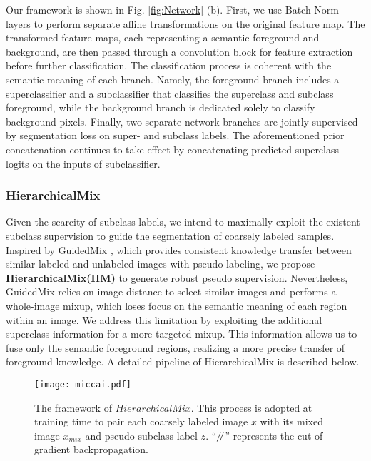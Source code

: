 \documentclass[runningheads]{llncs}
\newcommand{\sslash}{\mathbin{/\mkern-4mu/}}
\begin{document}
Our framework is shown in Fig. \ref{fig:Network} (b). First, we use Batch Norm layers\cite{ioffe2015batch} to perform separate affine transformations on the original feature map. The transformed feature maps, each representing a semantic foreground and background, are then passed through a convolution block for feature extraction before further classification. The classification process is coherent with the semantic meaning of each branch. Namely, the foreground branch includes a superclassifier and a subclassifier that classifies the superclass and subclass foreground, while the background branch is dedicated solely to classify background pixels. Finally, two separate network branches are jointly supervised by segmentation loss on super- and subclass labels. The aforementioned prior concatenation continues to take effect by concatenating predicted superclass logits on the inputs of subclassifier.

\subsubsection{HierarchicalMix}
Given the scarcity of subclass labels, we intend to maximally exploit the existent subclass supervision to guide the segmentation of coarsely labeled samples. Inspired by GuidedMix \cite{Peng2022}, which provides consistent knowledge transfer between similar labeled and unlabeled images with pseudo labeling, we propose \textbf{HierarchicalMix(HM)} to generate robust pseudo supervision. Nevertheless, GuidedMix relies on image distance to select similar images and performs a whole-image mixup, which loses focus on the semantic meaning of each region within an image. We address this limitation by exploiting the additional superclass information for a more targeted mixup. This information allows us to fuse only the semantic foreground regions, realizing a more precise transfer of foreground knowledge. A detailed pipeline of HierarchicalMix is described below.

\begin{figure}[tbp]
\centering
\texttt{[image: miccai.pdf]}
\caption{The framework of $HierarchicalMix$. This process is adopted at training time to pair each coarsely labeled image $x$ with its mixed image $x_{mix}$ and pseudo subclass label $z$. ``$\sslash$'' represents the cut of gradient backpropagation.}
\label{fig:mixup}
\end{figure}
\end{document}
